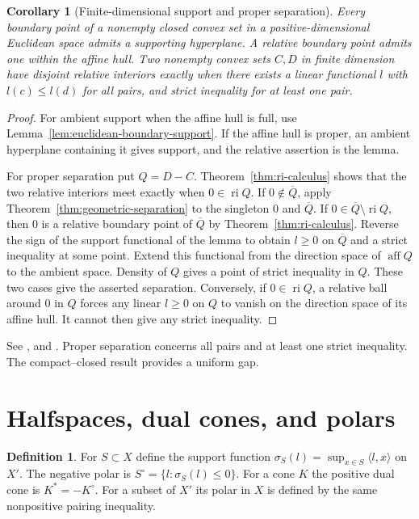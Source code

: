 \documentclass[11pt,oneside,openany]{book}
\theoremstyle{plain}
\newtheorem{corollary}[theorem]{Corollary}
\theoremstyle{definition}
\newtheorem{definition}[theorem]{Definition}
\theoremstyle{remark}
\begin{document}
\begin{corollary}[Finite-dimensional support and proper separation]
\label{thm:proper-separation}
Every boundary point of a nonempty closed convex set in a
positive-dimensional Euclidean space admits a supporting hyperplane.
A relative boundary point admits one within the affine hull.
Two nonempty convex sets \(C,D\) in finite dimension have disjoint
relative interiors exactly when there exists a linear functional
\(l\) with \(l(c)\le l(d)\) for all pairs, and strict inequality
for at least one pair.
\end{corollary}

\begin{proof}
For ambient support when the affine hull is full, use
Lemma~\ref{lem:euclidean-boundary-support}. If the affine hull
is proper, an ambient hyperplane containing it gives support,
and the relative assertion is the lemma.

For proper separation put \(Q=D-C\).
Theorem~\ref{thm:ri-calculus} shows that the two relative
interiors meet exactly when \(0\in\operatorname{ri}Q\).
If \(0\notin\overline Q\), apply
Theorem~\ref{thm:geometric-separation} to the singleton \(0\)
and \(\overline Q\). If \(0\in\overline Q\setminus\operatorname{ri}Q\),
then \(0\) is a relative boundary point of \(\overline Q\)
by Theorem~\ref{thm:ri-calculus}. Reverse the sign of the
support functional of the lemma to obtain \(l\ge0\) on
\(\overline Q\) and a strict inequality at some point.
Extend this functional from the direction space of
\(\operatorname{aff}Q\) to the ambient space. Density of \(Q\)
gives a point of strict inequality in \(Q\). These two cases
give the asserted separation. Conversely, if \(0\in\operatorname{ri}Q\),
a relative ball around \(0\) in \(Q\) forces any linear \(l\ge0\)
on \(Q\) to vanish on the direction space of its affine hull.
It cannot then give any strict inequality.
\end{proof}

See \cite[\S11]{Rockafellar}, \cite[Chapter I, \S1]{EkelandTemam}
and \cite[\S1.2]{Brezis}. Proper separation concerns all pairs
and at least one strict inequality. The compact--closed result
provides a uniform gap.

\section{Halfspaces, dual cones, and polars}\label{v01-05}

\begin{definition}
For \(S\subset X\) define the support function
\(\sigma_S(l)=\sup_{x\in S}\langle l,x\rangle\) on \(X'\).
The negative polar is \(S^\circ=\{l:\sigma_S(l)\le0\}\).
For a cone \(K\) the positive dual cone is
\(K^*=-K^\circ\). For a subset of \(X'\) its polar in \(X\)
is defined by the same nonpositive pairing inequality.
\end{definition}
\end{document}
